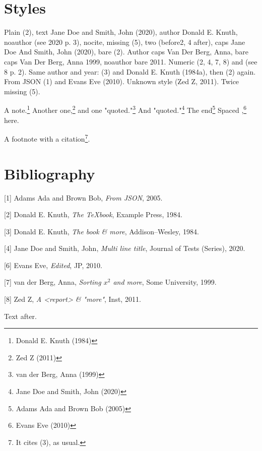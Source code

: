 \section{Styles}
\label{sec:org3028fdc}
Plain (2), text Jane Doe and Smith, John (2020), author Donald E. Knuth,
noauthor (see 2020 p. 3), nocite, missing (5),
two (before2, 4 after), caps Jane Doe And Smith, John (2020), bare (2).
Author caps Van Der Berg, Anna, bare caps Van Der Berg, Anna 1999, noauthor bare 2011.
Numeric (2, 4, 7, 8) and (see 8 p. 2).
Same author and year: (3) and Donald E. Knuth (1984a), then (2) again.
From JSON (1) and Evans Eve (2010).
Unknown style (Zed Z, 2011).  Twice missing (5).

A note.\footnote{Donald E. Knuth (1984)} Another one,\footnote{Zed Z (2011)} and one "quoted."\footnote{van der Berg, Anna (1999)}
And "quoted."\footnote{Jane Doe and Smith, John (2020)} The end\footnote{Adams Ada and Brown Bob (2005)}
Spaced ,\footnote{Evans Eve (2010)}  here.

A footnote with a citation\footnote{It cites (3), as usual.}.
\section{Bibliography}
\label{sec:org0af2b60}
\noindent
{[}1] Adams Ada and Brown Bob, \emph{From JSON}, 2005.

\noindent
{[}2] Donald E. Knuth, \emph{The {\TeX}book}, Example Press, 1984.

\noindent
{[}3] Donald E. Knuth, \emph{The \METAFONT book \& more}, Addison--Wesley, 1984.

\noindent
{[}4] Jane Doe and Smith, John, \emph{Multi line title}, Journal of Tests (Series), 2020.

\noindent
{[}6] Evans Eve, \emph{Edited}, JP, 2010.

\noindent
{[}7] van der Berg, Anna, \emph{Sorting $x^2$ and \alpha{} more}, Some University, 1999.

\noindent
{[}8] Zed Z, \emph{A <report> & "more"}, Inst, 2011.

Text after.

